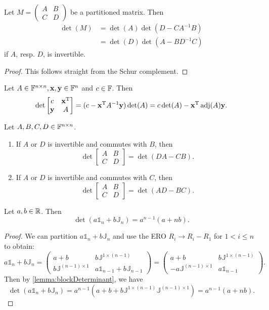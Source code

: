 \begin{lemma} \label{lemma:blockDeterminant}
Let $M = \begin{pmatrix}
A & B \\ C & D
\end{pmatrix}$ be a partitioned matrix. Then
\begin{align*}
\det(M) &= \det(A)\det(D-CA^{-1}B) \\
&= \det(D)\det(A-BD^{-1}C)
\end{align*}
if $A$, resp. $D$, is invertible.
\end{lemma}
\begin{proof}
This follows straight from the Schur complement.
\end{proof}
\begin{corollary}
Let $A\in\mathbb{F}^{n\times n}, \bm{\mathrm{x}},\bm{\mathrm{y}}\in\mathbb{F}^n$ and $c\in \mathbb{F}$. Then
\[ \det \begin{bmatrix}
c & \bm{\mathrm{x}}^{\mathrm{T}} \\ \bm{\mathrm{y}} & A
\end{bmatrix} = (c-\bm{\mathrm{x}}^{\mathrm{T}} A^{-1}\bm{\mathrm{y}})\det(A) = c\det(A) - \bm{\mathrm{x}}^{\mathrm{T}} \operatorname{adj}(A) \bm{\mathrm{y}}. \]
\end{corollary}
\begin{corollary}
Let $A,B,C,D\in\mathbb{F}^{n\times n}$.
\begin{enumerate}
\item If $A$ or $D$ is invertible and commutes with $B$, then
\[ \det\begin{bmatrix}
A & B \\ C & D
\end{bmatrix} = \det(DA-CB). \]
\item If $A$ or $D$ is invertible and commutes with $C$, then
\[ \det\begin{bmatrix}
A & B \\ C & D
\end{bmatrix} = \det(AD-BC). \]
\end{enumerate}
\end{corollary}

\begin{lemma}
Let $a,b\in\mathbb{R}$. Then
\[ \det(a\mathbb{1}_n+b\mathbb{J}_n) = a^{n-1}(a+nb). \]
\end{lemma}
\begin{proof}
We can partition $a\mathbb{1}_n+b\mathbb{J}_n$ and use the ERO $R_i\to R_i-R_1$ for $1<i\leq n$ to obtain:
\[ a\mathbb{1}_n+b\mathbb{J}_n = \begin{pmatrix}
a+b & b\mathbb{J}^{1\times (n-1)} \\
b\mathbb{J}^{(n-1)\times 1} & a\mathbb{1}_{n-1}+b\mathbb{J}_{n-1}
\end{pmatrix} = \begin{pmatrix}
a+b & b\mathbb{J}^{1\times (n-1)} \\
-a\mathbb{J}^{(n-1)\times 1} & a\mathbb{1}_{n-1}
\end{pmatrix}. \]
Then by \ref{lemma:blockDeterminant}, we have
\[ \det(a\mathbb{1}_n+b\mathbb{J}_n) = a^{n-1}(a+b +b\mathbb{J}^{1\times (n-1)}\mathbb{J}^{(n-1)\times 1}) = a^{n-1}(a+nb). \]
\end{proof}

